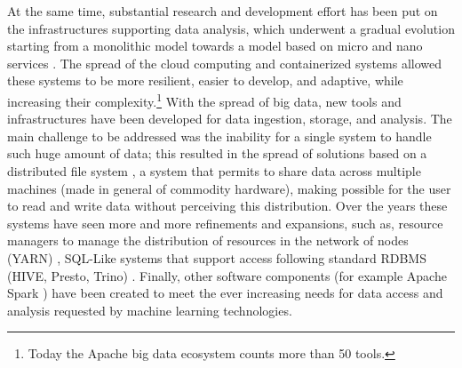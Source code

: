 At the same time, substantial research and development effort has been put on the infrastructures supporting data analysis, which underwent a gradual evolution starting from a monolithic model towards a model based on micro and nano services \cite{kratzke2018brief}. The spread of the cloud computing and  containerized systems allowed these systems to be more resilient, easier to develop, and adaptive, while increasing their complexity.\footnote{Today the Apache big data ecosystem counts more than 50 tools.}
With the spread of big data, new tools and infrastructures have been developed for data ingestion, storage, and analysis. The main challenge to be addressed was the inability for a single system to handle such huge amount of data; this resulted in the spread of solutions based on a distributed file system \cite{blomer2015survey}, a system that permits to share data across multiple machines (made in general of commodity hardware), making possible for the user to read and write data without perceiving this distribution. Over the years these systems have seen more and more refinements and expansions, such as, resource managers to manage the distribution of resources in the network of nodes (YARN) \cite{kulkarni2014survey}, SQL-Like systems that support access following standard RDBMS (HIVE, Presto, Trino) \cite{thusoo2009hive,sethi2019presto}. Finally, other software components (for example Apache Spark \cite{salloum2016big}) have been created to meet the ever increasing needs for data access and analysis requested by machine learning technologies.
